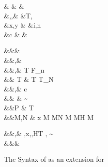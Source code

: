 \documentclass[manuscript,screen,nonacm]{acmart}
\begin{document}
\begin{figure}[h]
 \centering
 \begin{syntax}
  &\shl{\chi} &  & \\
  &\TyVar,\beta,\Co &\qquad{} &T, \\
  &x,y &\qquad{} &i,n \in {} \\
  &c & &
 \end{syntax}
 \begin{syntax}
  &&\square & \\
  &&\kappa,\eta \bnfeq& \shl{\chi} \bnfor \STAR \bnfor {} \bnfor \kappa \to \kappa \bnfor {}\\
  &&\tau,\sigma \bnfeq& \TyVar \bnfor T \bnfor \tau \to \tau \bnfor \tau\App\tau \bnfor \Forall {\TyVar\co\kappa} \tau \bnfor F_n \bnfor \shl{\Forall \chi \tau} \bnfor \shl{\tau\App\kappa} \bnfor {}\\
  && T \bnfeq& T \bnfor T_N\\
  &&\nu,\Co \bnfeq& c \bnfor {}\tau \bnfor \Sym\Co \bnfor \trans\nu\Co %
 \bnfor \Forall {\TyVar\co\kappa} \Co \bnfor \Co\At\tau %
 \bnfor \nu\App\Co \bnfor \Left \Co \bnfor \Right \Co  %
 \bnfor \shl{\Forall \chi \Co} \bnfor \shl{\Co\App\chi} %
 \bnfor \shl{\Co\At\chi}\\
  && \phi \bnfeq& \sigma \sim \tau\\
  &&P \bnfeq& T\App\shl{\many\chi}\App\many{\TyVar\co\kappa} \\
  &&M,N \bnfeq& x \bnfor {} M \bnfor M\App N \bnfor \TLam{\tau\co\kappa} M \bnfor M\App \tau \bnfor H \bnfor \Case M  \bnfor \Cast \Tm \Co %
 \bnfor \shl{\TLam \chi \Tm} \bnfor \shl{\Tm\App\kappa} \\

 \end{syntax}
 \begin{syntax}
  &&\TEnv,\Delta \bnfeq& \empt \bnfor \TEnv,x\co\tau \bnfor \TEnv,\TyVar\co\kappa \bnfor \TEnv,H\co T \bnfor \TEnv, \Co \co \tau\sim\sigma\\
  &&\Subst \bnfeq& \empt \bnfor \Set{\many{\TyVar \mapsto \tau}}
 \end{syntax}
 \caption{The Syntax of \SFP as an extension for \SFR}
 \label{fig:sfp-syntax}
\end{figure}
\end{document}

